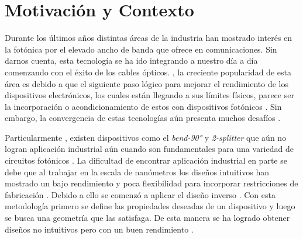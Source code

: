 \chapter{Motivación y Contexto}

Durante los últimos años distintas áreas de la industria han mostrado interés en la fotónica por el elevado ancho de banda que ofrece en comunicaciones.
Sin darnos cuenta, esta tecnología se ha ido integrando a nuestro día a día comenzando con el éxito de los cables ópticos. 
, la creciente popularidad  de esta área es debido a que el siguiente paso lógico para mejorar el rendimiento de los dispositivos electrónicos, los cuales están llegando a sus límites físicos, parece ser la incorporación o acondicionamiento de estos con dispositivos fotónicos \citep{Glick2018, LukasChrostowski2010}.
Sin embargo, la convergencia  de estas tecnologías aún presenta muchos desafíos . 

Particularmente , existen dispositivos como el \emph{bend-90°} y \emph{2-splitter} que aún no logran aplicación industrial  aún cuando son fundamentales para una variedad de circuitos fotónicos \citep{Molesky2018}. La dificultad de encontrar aplicación industrial  en parte se debe que al trabajar en la escala de nanómetros los diseños intuitivos han mostrado un bajo rendimiento y poca flexibilidad para incorporar restricciones de fabricación . 
Debido a ello se comenzó a aplicar el diseño inverso . 
Con esta metodología primero se define las propiedades deseadas de un dispositivo y luego se busca una geometría que las satisfaga.
De esta manera se ha logrado obtener diseños no intuitivos pero con un buen rendimiento \citep{Su2020}.

